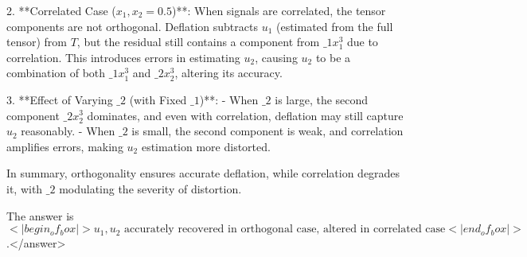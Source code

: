 2. **Correlated Case (\( x_1, x_2 = 0.5 \))**:  
   When signals are correlated, the tensor components are not orthogonal. Deflation subtracts \( u_1 \) (estimated from the full tensor) from \( T \), but the residual still contains a component from \( \_1 x_1^3 \) due to correlation. This introduces errors in estimating \( u_2 \), causing \( u_2 \) to be a combination of both \( \_1 x_1^3 \) and \( \_2 x_2^3 \), altering its accuracy.  

3. **Effect of Varying \( \_2 \) (with Fixed \( \_1 \))**:  
   - When \( \_2 \) is large, the second component \( \_2 x_2^3 \) dominates, and even with correlation, deflation may still capture \( u_2 \) reasonably.  
   - When \( \_2 \) is small, the second component is weak, and correlation amplifies errors, making \( u_2 \) estimation more distorted.  

In summary, orthogonality ensures accurate deflation, while correlation degrades it, with \( \_2 \) modulating the severity of distortion.  

The answer is \(<|begin_of_box|>u_1, u_2 \text{ accurately recovered in orthogonal case, altered in correlated case}<|end_of_box|>\).</answer>